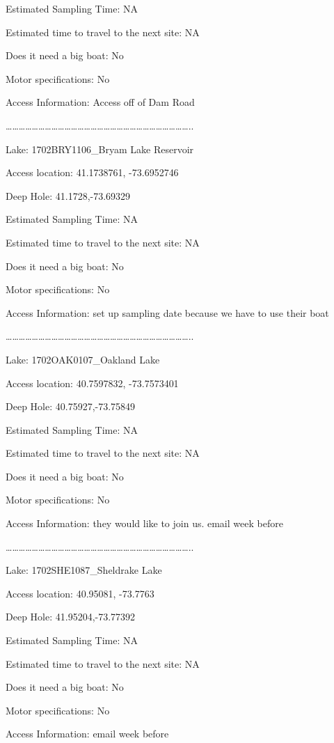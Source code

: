 \documentclass[]{article}
\begin{document}
Estimated Sampling Time: NA

Estimated time to travel to the next site: NA

Does it need a big boat: No

Motor specifications: No

Access Information: Access off of Dam Road

\ldots{}\ldots{}\ldots{}\ldots{}\ldots{}\ldots{}\ldots{}\ldots{}\ldots{}\ldots{}\ldots{}\ldots{}\ldots{}\ldots{}\ldots{}\ldots{}\ldots{}\ldots{}\ldots{}\ldots{}\ldots{}\ldots{}\ldots{}\ldots{}\ldots{}\ldots{}\ldots{}\ldots{}..

Lake: 1702BRY1106\_Bryam Lake Reservoir

Access location: 41.1738761, -73.6952746

Deep Hole: 41.1728,-73.69329

Estimated Sampling Time: NA

Estimated time to travel to the next site: NA

Does it need a big boat: No

Motor specifications: No

Access Information: set up sampling date because we have to use their
boat

\ldots{}\ldots{}\ldots{}\ldots{}\ldots{}\ldots{}\ldots{}\ldots{}\ldots{}\ldots{}\ldots{}\ldots{}\ldots{}\ldots{}\ldots{}\ldots{}\ldots{}\ldots{}\ldots{}\ldots{}\ldots{}\ldots{}\ldots{}\ldots{}\ldots{}\ldots{}\ldots{}\ldots{}..

Lake: 1702OAK0107\_Oakland Lake

Access location: 40.7597832, -73.7573401

Deep Hole: 40.75927,-73.75849

Estimated Sampling Time: NA

Estimated time to travel to the next site: NA

Does it need a big boat: No

Motor specifications: No

Access Information: they would like to join us. email week before

\ldots{}\ldots{}\ldots{}\ldots{}\ldots{}\ldots{}\ldots{}\ldots{}\ldots{}\ldots{}\ldots{}\ldots{}\ldots{}\ldots{}\ldots{}\ldots{}\ldots{}\ldots{}\ldots{}\ldots{}\ldots{}\ldots{}\ldots{}\ldots{}\ldots{}\ldots{}\ldots{}\ldots{}..

Lake: 1702SHE1087\_Sheldrake Lake

Access location: 40.95081, -73.7763

Deep Hole: 41.95204,-73.77392

Estimated Sampling Time: NA

Estimated time to travel to the next site: NA

Does it need a big boat: No

Motor specifications: No

Access Information: email week before
\end{document}
